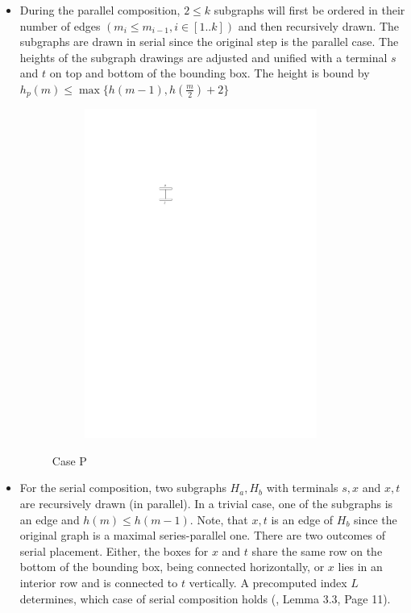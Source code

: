 \begin{description}
	\begin{itemize}
		\item During the parallel composition, $2\leq k$ subgraphs will first be ordered in their number of edges $(m_i \leq m_{i-1}, i \in[1..k])$ and then recursively drawn. The subgraphs are drawn in serial since the original step is the parallel case. The heights of the subgraph drawings are adjusted and unified with a terminal $s$ and $t$ on top and bottom of the bounding box. The height is bound by $h_p(m)\leq\max\{h(m-1),h\left(\frac{m}{2}\right)+2\}$
		\begin{figure}[H]
			\centering
			\begin{subfigure}{0.7\linewidth}
				\centering
				\includegraphics[width=0.9\textwidth,page=4]{drawings/2-trees.pdf}
			\end{subfigure}
			\caption{Case P}\label{im:SP_CaseP}
		\end{figure}
		\item For the serial composition, two subgraphs $H_a, H_b$ with terminals  $s,x$ and $x,t$ are recursively drawn (in parallel). In a trivial case, one of the subgraphs is an edge and $h(m)\leq h(m-1)$. Note, that $x,t$ is an edge of $H_b$ since the original graph is a maximal series-parallel one. There are two outcomes of serial placement. Either, the boxes for $x$ and $t$ share the same row on the bottom of the bounding box, being connected horizontally, or $x$ lies in an interior row and is connected to $t$ vertically. A precomputed index $L$ determines, which case of serial composition holds (\cite{DBLP:journals/dcg/Biedl11}, Lemma 3.3, Page 11).

\end{itemize}
\end{description}
